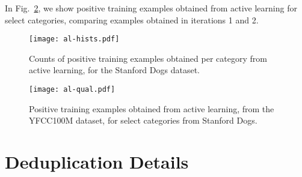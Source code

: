 \documentclass[runningheads]{llncs}
\begin{document}
In Fig.~\ref{fig:al-qual}, we show positive training examples obtained from active learning for select categories, comparing examples obtained in iterations 1 and 2.


\begin{figure}[t]
\centering
\texttt{[image: al-hists.pdf]}
\caption{ Counts of positive training examples obtained per category from active learning, for the Stanford Dogs dataset.}
\label{fig:al-hists}
\end{figure}

\begin{figure}[t]
\centering
\texttt{[image: al-qual.pdf]}
\caption{Positive training examples obtained from active learning, from the YFCC100M dataset, for select categories from Stanford Dogs.}
\label{fig:al-qual}
\end{figure}


\section{Deduplication Details}
\label{app_sec:dedup}
\end{document}
